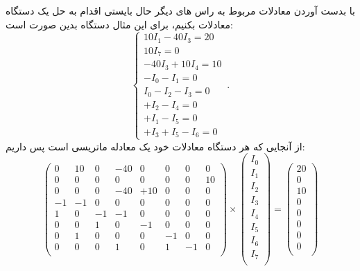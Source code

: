 با بدست آوردن معادلات
 مربوط به راس های دیگر حال بایستی اقدام به حل یک دستگاه معادلات بکنیم،
 برای این مثال دستگاه بدین صورت است:
 \begin{equation}
	\begin{cases}
		10 I_1 - 40 I_3 = 20\\
		10 I_7 = 0\\
		-40 I_3 + 10 I_4 = 10\\
		-I_0  -I_1 = 0\\
		I_0 -I_2 -I_3 = 0\\
		+I_2 - I_4 = 0 \\
		+I_1 - I_5 = 0 \\
		+I_3 + I_5 - I_6 = 0
	\end{cases}\,.
\end{equation}
از آنجایی که هر دستگاه معادلات خود یک معادله ماتریسی است پس داریم:
 \begin{equation}
\begin{pmatrix}
	0 & 10 & 0 & -40 & 0 & 0 & 0 & 0\\
	0 & 0 & 0 & 0 & 0 & 0 & 0 & 10\\
	0 & 0 & 0 & -40 & +10 & 0 & 0 & 0\\
	-1 & -1 & 0 & 0 & 0 & 0 & 0 & 0\\
	1 & 0 & -1 & -1 & 0 & 0 & 0 & 0\\
	0 & 0 & 1 & 0 & -1 & 0 & 0 & 0\\
	0 & 1 & 0 & 0 & 0 & -1 & 0 & 0\\
	0 & 0 & 0 & 1 & 0 & 1 & -1 & 0\\
\end{pmatrix}
\times
\begin{pmatrix}
I_0\\
I_1\\
I_2\\
I_3\\
I_4\\
I_5\\
I_6\\
I_7\\
\end{pmatrix}
=
\begin{pmatrix}
	20\\
	0\\
	10\\
	0\\
	0\\
	0\\
	0\\
	0\\
\end{pmatrix}
\end{equation}

